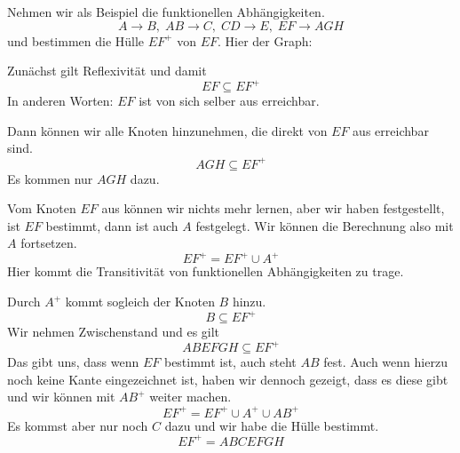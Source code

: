 \documentclass[a4paper, ngerman]{article}
\begin{document}
Nehmen wir als Beispiel
die funktionellen Abhängigkeiten.
$$
    A  \to B,\;
    AB \to C,\;
    CD \to E,\;
    EF \to AGH
$$
und bestimmen die Hülle $EF^+$ von $EF$.
Hier der Graph:
\begin{center}
\end{center}
Zunächst gilt Reflexivität und damit
$$
    EF \subseteq EF^+
$$
In anderen Worten: $EF$ ist von sich selber aus erreichbar.

Dann können wir alle Knoten hinzunehmen,
die direkt von $EF$ aus erreichbar sind.
$$
    AGH \subseteq EF^+  
$$
Es kommen nur $AGH$ dazu.

Vom Knoten $EF$ aus können wir nichts mehr lernen,
aber wir haben festgestellt, ist $EF$ bestimmt,
dann ist auch $A$ festgelegt.
Wir können die Berechnung also mit $A$ fortsetzen.
$$
    EF^+ = EF^+ \cup A^+
$$
Hier kommt die Transitivität
von funktionellen Abhängigkeiten zu trage.

Durch $A^+$ kommt sogleich der Knoten $B$ hinzu.
$$
    B \subseteq EF^+
$$
Wir nehmen Zwischenstand und es gilt
$$
    ABEFGH \subseteq EF^+
$$
Das gibt uns, dass wenn $EF$ bestimmt ist,
auch steht $AB$ fest.
Auch wenn hierzu noch keine Kante eingezeichnet ist,
haben wir dennoch gezeigt, dass es diese gibt
und wir können mit $AB^+$ weiter machen.
$$
    EF^+ = EF^+ \cup A^+ \cup AB^+
$$
Es kommst aber nur noch $C$ dazu
und wir habe die Hülle bestimmt.
$$
    EF^+ = ABCEFGH
$$
\end{document}
